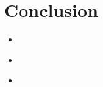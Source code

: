 \section{Conclusion}
\medskip
\begin{itemize}

    - Briefly summarize your main observations
    - Did your visualizations help you to better understand the MovieLens dataset?

    \item {} \\

    \item {} \\

    \item {} \\

\end{itemize}




